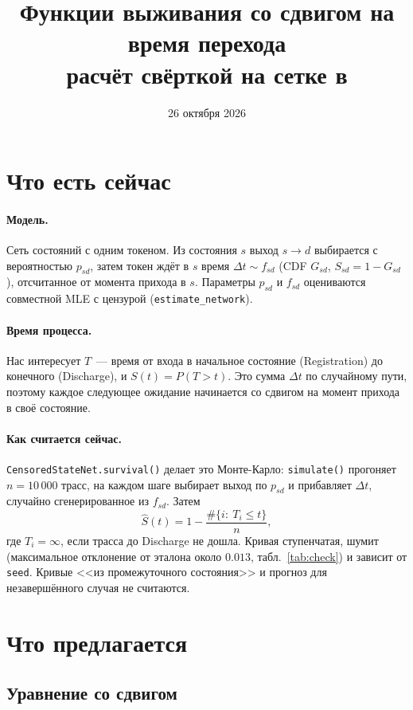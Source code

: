 \documentclass[11pt,a4paper]{article}
\title{Функции выживания со сдвигом на время перехода\\\large расчёт свёрткой на сетке в \code{survpm}}
\date{26 октября 2026}
\newcommand{\code}[1]{\texttt{#1}}
\begin{document}
\maketitle

\section{Что есть сейчас}

\paragraph{Модель.} Сеть состояний с одним токеном. Из состояния $s$ выход $s\to d$
выбирается с вероятностью $p_{sd}$, затем токен ждёт в $s$ время
$\Delta t\sim f_{sd}$ (CDF $G_{sd}$, $S_{sd}=1-G_{sd}$), отсчитанное от момента прихода в $s$.
Параметры $p_{sd}$ и $f_{sd}$ оцениваются совместной MLE с цензурой (\code{estimate\_network}).

\paragraph{Время процесса.} Нас интересует $T$~--- время от входа в начальное состояние
(Registration) до конечного (Discharge), и $S(t)=P(T>t)$. Это сумма $\Delta t$ по
случайному пути, поэтому каждое следующее ожидание начинается со сдвигом на момент прихода
в своё состояние.

\paragraph{Как считается сейчас.} \code{CensoredStateNet.survival()} делает это
Монте-Карло: \code{simulate()} прогоняет $n=10\,000$ трасс, на каждом шаге выбирает выход по
$p_{sd}$ и прибавляет $\Delta t$, случайно сгенерированное из $f_{sd}$. Затем
\[
\hat S(t)=1-\frac{\#\{i:\ T_i\le t\}}{n},
\]
где $T_i=\infty$, если трасса до Discharge не дошла. Кривая ступенчатая, шумит
(максимальное отклонение от эталона около $0.013$, табл.~\ref{tab:check}) и зависит от \code{seed}.
Кривые <<из промежуточного состояния>> и прогноз для незавершённого случая не считаются.

\section{Что предлагается}

\subsection{Уравнение со сдвигом}
\end{document}
